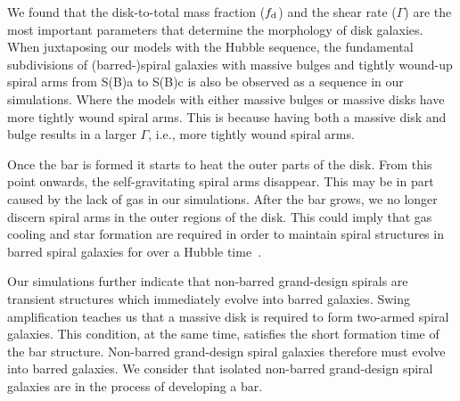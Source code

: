 We found that the disk-to-total mass fraction ($f_{\rm d}$)
and the shear rate ($\Gamma$) are the most important parameters that determine the
morphology of disk galaxies. 
When juxtaposing our models with the Hubble sequence,
the fundamental subdivisions of (barred-)spiral galaxies with 
massive bulges and tightly wound-up spiral arms from S(B)a to S(B)c is 
also be observed as a sequence in our simulations. Where the models 
with either massive bulges or massive disks have more tightly
wound spiral arms. This is because having both a massive disk and bulge results in 
a larger $\Gamma$, i.e., more tightly wound spiral arms. 


Once the
bar is formed it starts to heat the outer parts of the disk.
From this point onwards, 
the self-gravitating spiral arms disappear.
This may be in part caused by the 
lack of gas in our simulations. 
After the bar grows, we no longer discern  
spiral arms in the outer regions of the disk. This could imply
that gas cooling and star formation are required in order to 
maintain spiral structures in barred spiral galaxies for over 
a Hubble time~\citep{1981ApJ...247...77S,1984ApJ...282...61S}.


Our simulations further indicate that non-barred grand-design spirals are
transient structures which immediately evolve into barred
galaxies. Swing amplification teaches us that a massive disk is
required to form two-armed spiral galaxies. This condition, at the
same time, satisfies the short formation time of the bar structure.
Non-barred grand-design spiral galaxies therefore must evolve into barred
galaxies.  We consider that isolated non-barred grand-design spiral galaxies 
are in the process of developing a bar.


